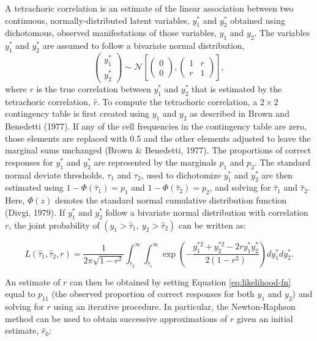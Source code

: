 \documentclass[
  english,
  man]{apa6}
\begin{document}
A tetrachoric correlation is an estimate of the linear association between two continuous, normally-distributed latent variables, \(y_1^*\) and \(y_2^*\) obtained using dichotomous, observed manifestations of those variables, \(y_1\) and \(y_2\). The variables \(y_1^*\) and \(y_2^*\) are assumed to follow a bivariate normal distribution,
\[
\left(\begin{array}{l}
y_{1}^* \\
y_{2}^*
\end{array}\right) \sim \mathcal{N}\left[\left(\begin{array}{l}
0 \\
0
\end{array}\right),\left(\begin{array}{cc}
1 & r \\
r & 1
\end{array}\right)\right],
\]
where \(r\) is the true correlation between \(y_1^*\) and \(y_2^*\) that is estimated by the tetrachoric correlation, \(\hat{r}\). To compute the tetrachoric correlation, a \(2 \times 2\) contingency table is first created using \(y_1\) and \(y_2\) as described in Brown and Benedetti (1977). If any of the cell frequencies in the contingency table are zero, those elements are replaced with 0.5 and the other elements adjusted to leave the marginal sums unchanged (Brown \& Benedetti, 1977). The proportions of correct responses for \(y_1^*\) and \(y_2^*\) are represented by the marginals \(p_1\) and \(p_2\). The standard normal deviate thresholds, \(\tau_1\) and \(\tau_2\), used to dichotomize \(y^*_1\) and \(y^*_2\) are then estimated using \(1 - \Phi(\hat{\tau}_1) = p_1\) and \(1 - \Phi(\hat{\tau}_2) = p_2\), and solving for \(\hat{\tau}_1\) and \(\hat{\tau}_2\). Here, \(\Phi(z)\) denotes the standard normal cumulative distribution function (Divgi, 1979). If \(y_1^*\) and \(y_2^*\) follow a bivariate normal distribution with correlation \(r\), the joint probability of \((y_1 > \hat{\tau}_1, \: y_2 > \hat{\tau}_2)\) can be written as:

\begin{equation}
L(\hat{\tau}_1, \hat{\tau}_2, r)=\frac{1}{2 \pi \sqrt{1-r^{2}}} \int_{\hat{\tau}_2}^{\infty} \int_{\hat{\tau}_1}^{\infty} \exp \left(-\frac{y_1^{*2}+y_2^{*2}-2 r y_1^* y_2^*}{2\left(1-r^{2}\right)}\right) d y_1^* d y_2^*.
\label{eq:likelihood-fn}
\end{equation}

An estimate of \(r\) can then be obtained by setting Equation \eqref{eq:likelihood-fn} equal to \(p_{11}\) (the observed proportion of correct responses for both \(y_1\) and \(y_2\)) and solving for \(r\) using an iterative procedure. In particular, the Newton-Raphson method can be used to obtain successive approximations of \(r\) given an initial estimate, \(\hat{r}_0\):
\end{document}
